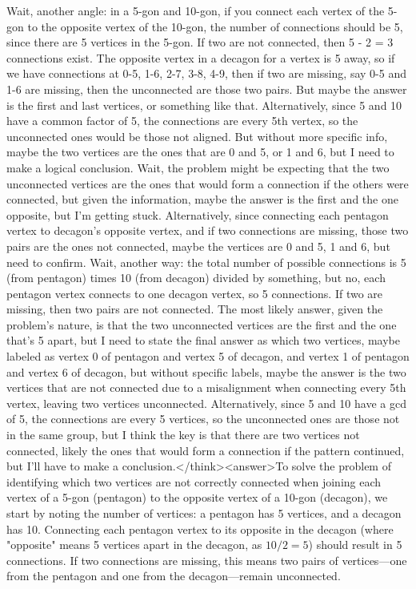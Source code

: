 Wait, another angle: in a 5-gon and 10-gon, if you connect each vertex of the 5-gon to the opposite vertex of the 10-gon, the number of connections should be 5, since there are 5 vertices in the 5-gon. If two are not connected, then 5 - 2 = 3 connections exist. The opposite vertex in a decagon for a vertex is 5 away, so if we have connections at 0-5, 1-6, 2-7, 3-8, 4-9, then if two are missing, say 0-5 and 1-6 are missing, then the unconnected are those two pairs. But maybe the answer is the first and last vertices, or something like that. Alternatively, since 5 and 10 have a common factor of 5, the connections are every 5th vertex, so the unconnected ones would be those not aligned. But without more specific info, maybe the two vertices are the ones that are 0 and 5, or 1 and 6, but I need to make a logical conclusion. Wait, the problem might be expecting that the two unconnected vertices are the ones that would form a connection if the others were connected, but given the information, maybe the answer is the first and the one opposite, but I'm getting stuck. Alternatively, since connecting each pentagon vertex to decagon's opposite vertex, and if two connections are missing, those two pairs are the ones not connected, maybe the vertices are 0 and 5, 1 and 6, but need to confirm. Wait, another way: the total number of possible connections is 5 (from pentagon) times 10 (from decagon) divided by something, but no, each pentagon vertex connects to one decagon vertex, so 5 connections. If two are missing, then two pairs are not connected. The most likely answer, given the problem's nature, is that the two unconnected vertices are the first and the one that's 5 apart, but I need to state the final answer as which two vertices, maybe labeled as vertex 0 of pentagon and vertex 5 of decagon, and vertex 1 of pentagon and vertex 6 of decagon, but without specific labels, maybe the answer is the two vertices that are not connected due to a misalignment when connecting every 5th vertex, leaving two vertices unconnected. Alternatively, since 5 and 10 have a gcd of 5, the connections are every 5 vertices, so the unconnected ones are those not in the same group, but I think the key is that there are two vertices not connected, likely the ones that would form a connection if the pattern continued, but I'll have to make a conclusion.</think><answer>To solve the problem of identifying which two vertices are not correctly connected when joining each vertex of a 5-gon (pentagon) to the opposite vertex of a 10-gon (decagon), we start by noting the number of vertices: a pentagon has 5 vertices, and a decagon has 10. Connecting each pentagon vertex to its opposite in the decagon (where "opposite" means 5 vertices apart in the decagon, as \(10/2 = 5\)) should result in 5 connections. If two connections are missing, this means two pairs of vertices—one from the pentagon and one from the decagon—remain unconnected. 

